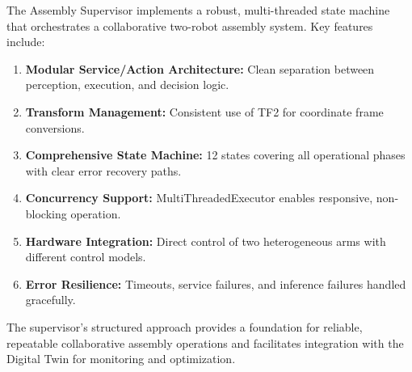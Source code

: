 The Assembly Supervisor implements a robust, multi-threaded state machine that orchestrates a collaborative two-robot assembly system. Key features include:

\begin{enumerate}
    \item \textbf{Modular Service/Action Architecture:} Clean separation between perception, execution, and decision logic.
    \item \textbf{Transform Management:} Consistent use of TF2 for coordinate frame conversions.
    \item \textbf{Comprehensive State Machine:} 12 states covering all operational phases with clear error recovery paths.
    \item \textbf{Concurrency Support:} MultiThreadedExecutor enables responsive, non-blocking operation.
    \item \textbf{Hardware Integration:} Direct control of two heterogeneous arms with different control models.
    \item \textbf{Error Resilience:} Timeouts, service failures, and inference failures handled gracefully.
\end{enumerate}

The supervisor's structured approach provides a foundation for reliable, repeatable collaborative assembly operations and facilitates integration with the Digital Twin for monitoring and optimization.
